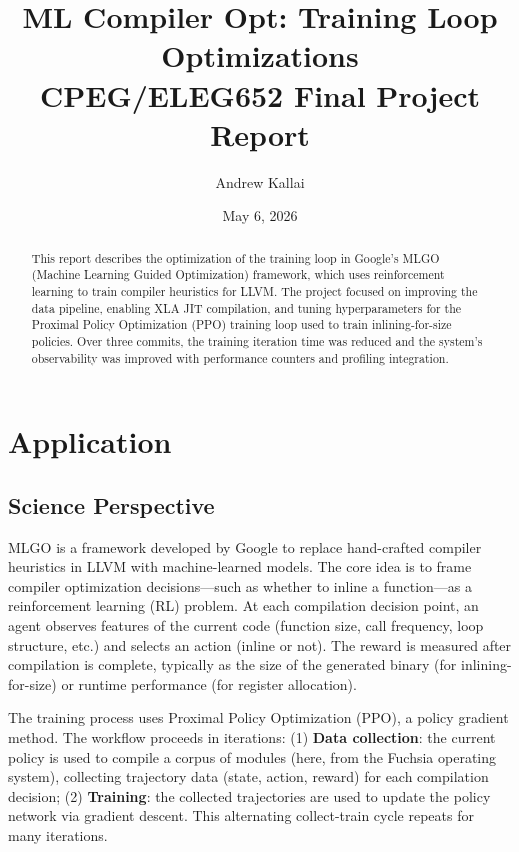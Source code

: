 \documentclass[10pt]{article}
\title{\textbf{ML Compiler Opt: Training Loop Optimizations} \\
\large CPEG/ELEG652 Final Project Report}
\author{Andrew Kallai}
\date{May 6, 2026}
\begin{document}
\maketitle

\begin{abstract}
This report describes the optimization of the training loop in Google's MLGO (Machine Learning Guided Optimization) framework, which uses reinforcement learning to train compiler heuristics for LLVM. The project focused on improving the data pipeline, enabling XLA JIT compilation, and tuning hyperparameters for the Proximal Policy Optimization (PPO) training loop used to train inlining-for-size policies. Over three commits, the training iteration time was reduced and the system's observability was improved with performance counters and profiling integration.
\end{abstract}

\section{Application}

\subsection{Science Perspective}

MLGO \cite{mlgo2021} is a framework developed by Google to replace hand-crafted compiler heuristics in LLVM with machine-learned models. The core idea is to frame compiler optimization decisions---such as whether to inline a function---as a reinforcement learning (RL) problem. At each compilation decision point, an agent observes features of the current code (function size, call frequency, loop structure, etc.) and selects an action (inline or not). The reward is measured after compilation is complete, typically as the size of the generated binary (for inlining-for-size) or runtime performance (for register allocation).

The training process uses Proximal Policy Optimization (PPO), a policy gradient method. The workflow proceeds in iterations: (1) \textbf{Data collection}: the current policy is used to compile a corpus of modules (here, from the Fuchsia operating system), collecting trajectory data (state, action, reward) for each compilation decision; (2) \textbf{Training}: the collected trajectories are used to update the policy network via gradient descent. This alternating collect-train cycle repeats for many iterations.
\end{document}
